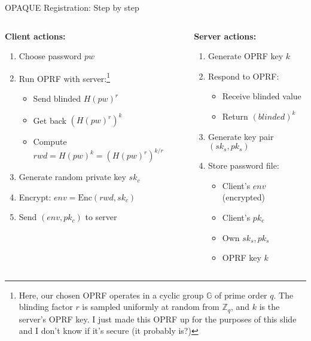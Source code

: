 \documentclass[aspectratio=169, lualatex, handout]{beamer}
\begin{document}
\begin{frame}{OPAQUE Registration: Step by step}
	\begin{columns}[c]
		\begin{column}{0.5\textwidth}
			\textbf{Client actions:}
			\begin{enumerate}
				\item Choose password $pw$
				\item Run OPRF with server:\footnote{Here, our chosen OPRF operates in a cyclic group $\mathbb{G}$ of prime order $q$. The blinding factor $r$ is sampled uniformly at random from $\mathbb{Z}_q$, and $k$ is the server's OPRF key. I just made this OPRF up for the purposes of this slide and I don't know if it's secure (it probably is?)}
				      \begin{itemize}
					      \item Send blinded $H(pw)^r$
					      \item Get back $(H(pw)^r)^k$
					      \item Compute $rwd = H(pw)^k = (H(pw)^r)^{k/r}$
				      \end{itemize}
				\item Generate random private key $sk_c$
				\item Encrypt: $env = \text{Enc}(rwd, sk_c)$
				\item Send $(env, pk_c)$ to server
			\end{enumerate}
		\end{column}
		\begin{column}{0.5\textwidth}
			\textbf{Server actions:}
			\begin{enumerate}
				\item Generate OPRF key $k$
				\item Respond to OPRF:
				      \begin{itemize}
					      \item Receive blinded value
					      \item Return $(blinded)^k$
				      \end{itemize}
				\item Generate key pair $(sk_s, pk_s)$
				\item Store password file:
				      \begin{itemize}
					      \item Client's $env$ (encrypted)
					      \item Client's $pk_c$
					      \item Own $sk_s, pk_s$
					      \item OPRF key $k$
				      \end{itemize}
			\end{enumerate}
		\end{column}
	\end{columns}
\end{frame}
\end{document}
